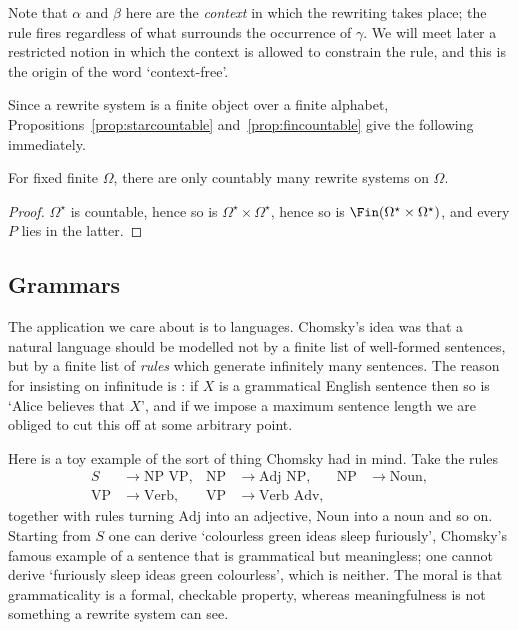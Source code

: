 Note that $\alpha$ and $\beta$ here are the \emph{context} in which the rewriting takes place; the rule fires regardless of what surrounds the occurrence of $\gamma$. We will meet later a restricted notion in which the context is allowed to constrain the rule, and this is the origin of the word `context-free'.

Since a rewrite system is a finite object over a finite alphabet, Propositions~\ref{prop:starcountable} and~\ref{prop:fincountable} give the following immediately.

\begin{proposition}
	For fixed finite $\Omega$, there are only countably many rewrite systems on $\Omega$.
\end{proposition}

\begin{proof}
	$\Omega^\star$ is countable, hence so is $\Omega^\star \times \Omega^\star$, hence so is $\Fin(\Omega^\star \times \Omega^\star)$, and every $P$ lies in the latter.
\end{proof}

\subsection{Grammars}

The application we care about is to languages. Chomsky's idea was that a natural language should be modelled not by a finite list of well-formed sentences, but by a finite list of \emph{rules} which generate infinitely many sentences. The reason for insisting on infinitude is : if $X$ is a grammatical English sentence then so is `Alice believes that $X$', and if we impose a maximum sentence length we are obliged to cut this off at some arbitrary point.

Here is a toy example of the sort of thing Chomsky had in mind. Take the rules
\begin{align*}
	S &\to \text{NP VP}, & \text{NP} &\to \text{Adj NP}, & \text{NP} &\to \text{Noun}, \\
	\text{VP} &\to \text{Verb}, & \text{VP} &\to \text{Verb Adv},
\end{align*}
together with rules turning $\text{Adj}$ into an adjective, $\text{Noun}$ into a noun and so on. Starting from $S$ one can derive `colourless green ideas sleep furiously', Chomsky's famous example of a sentence that is grammatical but meaningless; one cannot derive `furiously sleep ideas green colourless', which is neither. The moral is that grammaticality is a formal, checkable property, whereas meaningfulness is not something a rewrite system can see.

